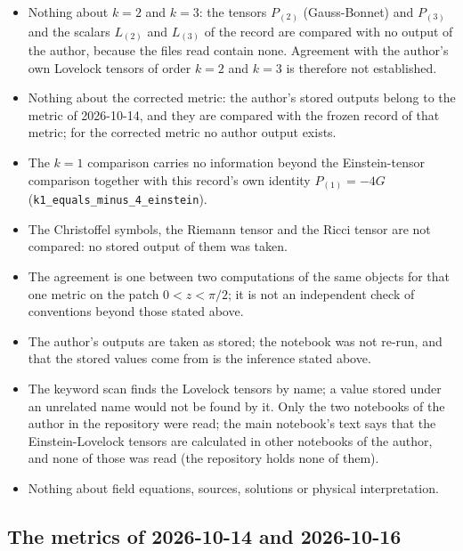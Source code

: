 \documentclass[11pt]{article}
\begin{document}
\begin{itemize}
\item Nothing about $k = 2$ and $k = 3$: the tensors $P_{(2)}$ (Gauss-Bonnet) and $P_{(3)}$ and the scalars $L_{(2)}$ and $L_{(3)}$ of the record are compared with no output of the author, because the files read contain none. Agreement with the author's own Lovelock tensors of order $k = 2$ and $k = 3$ is therefore not established.
\item Nothing about the corrected metric: the author's stored outputs belong to the metric of 2026-10-14, and they are compared with the frozen record of that metric; for the corrected metric no author output exists.
\item The $k = 1$ comparison carries no information beyond the Einstein-tensor comparison together with this record's own identity $P_{(1)} = -4G$ (\texttt{k1\_equal\allowbreak{}s\_minus\_\allowbreak{}4\_einste\allowbreak{}in}).
\item The Christoffel symbols, the Riemann tensor and the Ricci tensor are not compared: no stored output of them was taken.
\item The agreement is one between two computations of the same objects for that one metric on the patch $0 < z < \pi/2$; it is not an independent check of conventions beyond those stated above.
\item The author's outputs are taken as stored; the notebook was not re-run, and that the stored values come from \texttt{} is the inference stated above.
\item The keyword scan finds the Lovelock tensors by name; a value stored under an unrelated name would not be found by it. Only the two notebooks of the author in the repository were read; the main notebook's text says that the Einstein-Lovelock tensors are calculated in other notebooks of the author, and none of those was read (the repository holds none of them).
\item Nothing about field equations, sources, solutions or physical interpretation.
\end{itemize}

\subsection{The metrics of 2026-10-14 and 2026-10-16}
\end{document}
